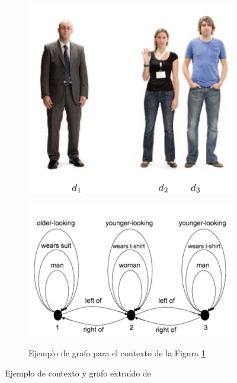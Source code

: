 \begin{figure}[!ht]
\begin{subfigure}{.4\textwidth}\centering
\includegraphics[width=\textwidth]{images/contexto-survey.png}\\[0pt]
\caption{}
\label{figura-survey}
\vspace*{.1cm}
\end{subfigure}
\hspace*{0cm}
\begin{subfigure}{.5\textwidth}\centering
\includegraphics[width=\textwidth]{images/grafo-survey.png}\\[0pt]
\caption{Ejemplo de grafo para el contexto de la Figura \ref{figura-survey}}
\label{grafo-survey}
\end{subfigure}
\caption{Ejemplo de contexto y grafo extra\'ido de \protect\cite{survey}}

\end{figure}



